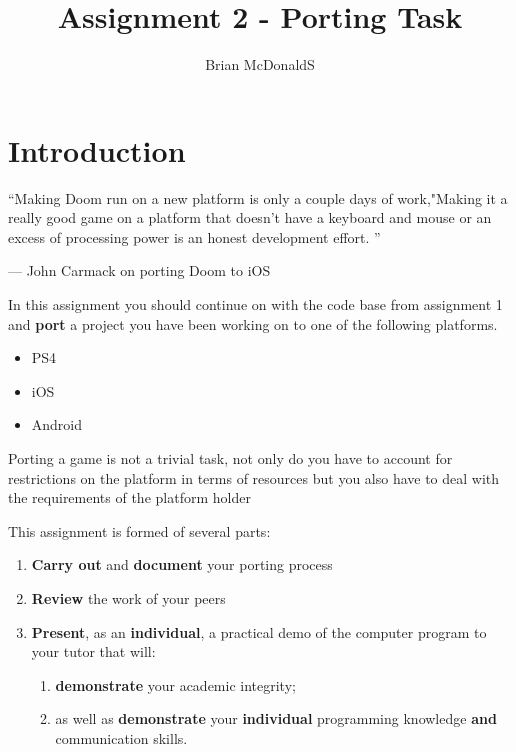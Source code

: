 \documentclass{../../fal_assignment}
\title{Assignment 2 - Porting Task}
\author{Brian McDonaldS}
\begin{document}
\maketitle

%

\section*{Introduction}

\begin{marginquote}
``Making Doom run on a new platform is only a couple days of work,"Making it a really good game on a platform that doesn't have a keyboard and mouse or an excess of processing power is an honest development effort. ''

--- John Carmack on porting Doom to iOS

    \marginquoterule
\end{marginquote}


In this assignment you should continue on with the code base from assignment 1 and \textbf{port} a project you have been working on to one of the following platforms.
\begin{itemize}
	\item PS4
	\item iOS
	\item Android
\end{itemize}

Porting a game is not a trivial task, not only do you have to account for restrictions on the platform in terms of resources but you also have to deal with the requirements of the platform holder

This assignment is formed of several parts:
\begin{enumerate}[label=(\Alph*)]
	\item \textbf{Carry out} and \textbf{document} your porting process
	\item \textbf{Review} the work of your peers
	\item \textbf{Present}, as an \textbf{individual}, a practical demo of the computer program to your tutor that will:
		\begin{enumerate}[label=\roman*.]
			\item \textbf{demonstrate} your academic integrity;
			\item as well as \textbf{demonstrate} your \textbf{individual} programming knowledge \textbf{and} communication skills.
		\end{enumerate}
\end{enumerate}
\end{document}
